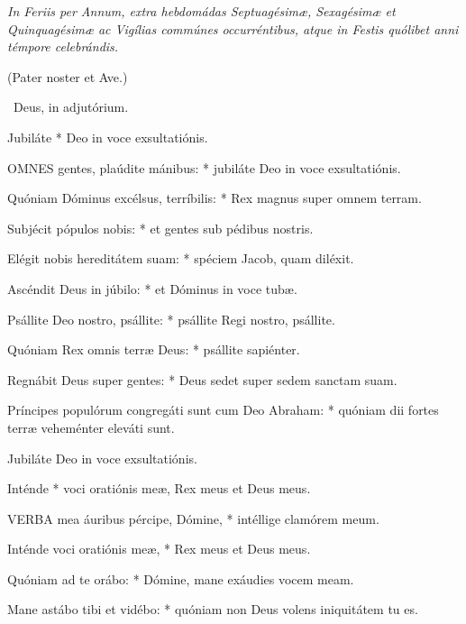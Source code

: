 \sectionornament


\textit{In Feriis per Annum, extra hebdomádas Septuagésimæ, Sexagésimæ et Quinquagésimæ ac Vigílias commúnes occurréntibus, atque in Festis quólibet anni témpore celebrándis.}

(Pater noster et Ave.)

\V\ Deus, in adjutórium.

 Jubiláte * Deo in voce exsultatiónis.



\lettrine[lines=2]{O}{MNES} gentes, plaúdite mánibus: * jubiláte Deo in voce exsultatiónis.

Quóniam Dóminus excélsus, terríbilis: * Rex magnus super omnem terram.

Subjécit pópulos nobis: * et gentes sub pédibus nostris.

Elégit nobis hereditátem suam: * spéciem Jacob, quam diléxit.

Ascéndit Deus in júbilo: * et Dóminus in voce tubæ.

Psállite Deo nostro, psállite: * psállite Regi nostro, psállite.

Quóniam Rex omnis terræ Deus: * psállite sapiénter.

Regnábit Deus super gentes: * Deus sedet super sedem sanctam suam.

Príncipes populórum congregáti sunt cum Deo Abraham: * quóniam dii fortes terræ veheménter eleváti sunt.

 Jubiláte Deo in voce exsultatiónis.

 Inténde * voci oratiónis meæ, Rex meus et Deus meus.


\lettrine[lines=2]{V}{ERBA} mea áuribus pércipe, Dómine, * intéllige clamórem meum.

Inténde voci oratiónis meæ, * Rex meus et Deus meus.

Quóniam ad te orábo: * Dómine, mane exáudies vocem meam.

Mane astábo tibi et vidébo: * quóniam non Deus volens iniquitátem tu es.

